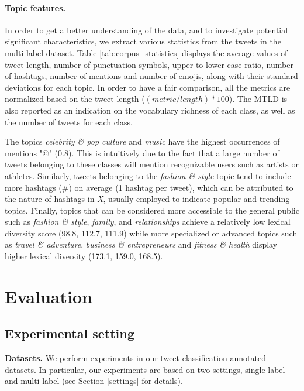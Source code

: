 \paragraph{Topic features.} In order to get a better understanding of the data, and to investigate potential significant characteristics, we extract various statistics from the tweets in the multi-label dataset. Table \ref{tab:corpus_statistics} displays the average values of tweet length, number of punctuation symbols, upper to lower case ratio, number of hashtags, number of mentions and number of emojis, along with their standard deviations for each topic. In order to have a fair comparison, all the metrics are normalized based on the tweet length ($(metric/length) * 100$). 
The \ac{MTLD} \cite{mccarthy2010mtld} is also reported as an indication on the vocabulary richness of each class, as well as the number of tweets for each class. 

The topics \textit{celebrity \& pop culture} and \textit{music} have the highest occurrences of mentions "@" (0.8). This is intuitively due to the fact that a large number of tweets belonging to these classes will mention recognizable users such as artists or athletes. Similarly, tweets belonging to the \textit{fashion \& style} topic tend to include more hashtags (\#) on average (1 hashtag per tweet), which can be attributed to the nature of hashtags in \textit{X}, usually employed to indicate popular and trending topics. %
Finally, topics that can be considered more accessible to the general public such as \textit{fashion \& style}, \textit{family}, and \textit{relationships} achieve a relatively low lexical diversity score (98.8, 112.7, 111.9) while more specialized or advanced topics such as \textit{travel \& adventure}, \textit{business \& entrepreneurs} and \textit{fitness \& health} display higher lexical diversity (173.1, 159.0, 168.5).

\section{Evaluation}\label{evaluation}

\subsection{Experimental setting}
\noindent \textbf{Datasets.} We perform experiments in our tweet classification annotated datasets. In particular, our experiments are based on two settings, single-label and multi-label (see Section \ref{settings} for details).

